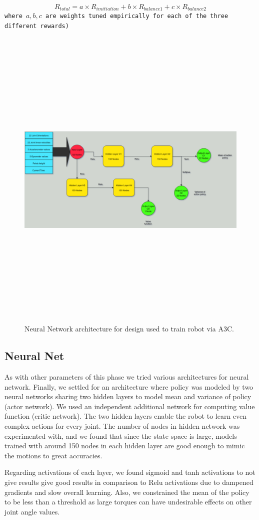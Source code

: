 $$R_{total} = a \times R_{imitiation} + b \times R_{balance1} + c \times R_{balance2}$$
\texttt{where $a,b,c$ are weights tuned empirically for each of the three different rewards)}
\vspace{1em}
\\
\begin{figure}
\centering
  \includegraphics[width=1\linewidth, height=15cm,keepaspectratio]{images/neural_net.png}
  \caption{Neural Network architecture for design used to train robot via A3C.}
  \label{fig:neural_net}
\end{figure}

\subsection{Neural Net}
As with other parameters of this phase we tried various architectures for neural network. Finally, we settled for an architecture where policy was modeled by two neural networks sharing two hidden layers to model mean and variance of policy (actor network). We used an independent additional network for computing value function (critic network). The two hidden layers enable the robot to learn even complex actions for every joint. 
The number of nodes in hidden network was experimented with, and we found that since the state space is large, models trained with around 150 nodes in each hidden layer are good enough to mimic the motions to great accuracies.

Regarding activations of each layer, we found sigmoid and tanh activations to not give results give good results in comparison to Relu activations due to dampened gradients and slow overall learning. Also, we constrained the mean of the policy to be less than a threshold as large torques can have undesirable effects on other joint angle values. 